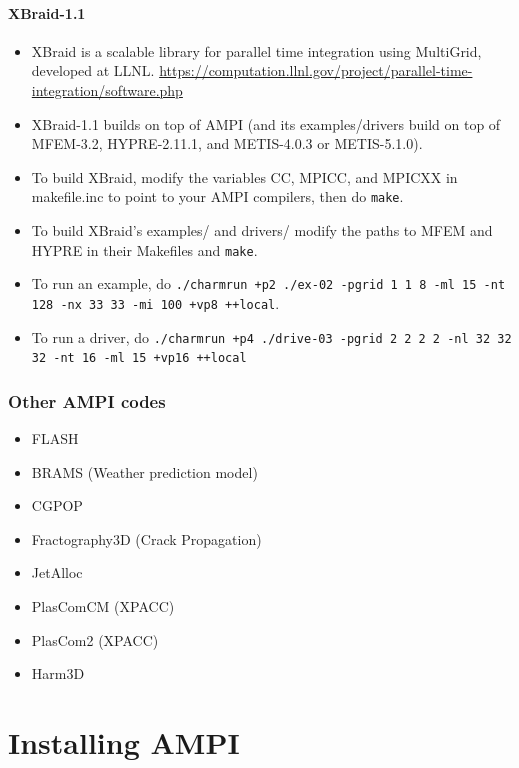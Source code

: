 \documentclass[10pt]{article}
\begin{document}
\paragraph{XBraid-1.1}
    \begin{itemize}
    \item
      XBraid is a scalable library for parallel time integration using
      MultiGrid, developed at LLNL. \url{https://computation.llnl.gov/project/parallel-time-integration/software.php}
    \item
      XBraid-1.1 builds on top of AMPI (and its examples/drivers build
      on top of MFEM-3.2, HYPRE-2.11.1, and METIS-4.0.3 or
      METIS-5.1.0).
    \item
      To build XBraid, modify the variables CC, MPICC, and MPICXX in
      makefile.inc to point to your AMPI compilers, then do \texttt{make}.
    \item
      To build XBraid's examples/ and drivers/ modify the paths to MFEM
      and HYPRE in their Makefiles and \texttt{make}.
    \item
      To run an example, do \texttt{./charmrun +p2 ./ex-02 -pgrid 1 1 8 -ml 15
      -nt 128 -nx 33 33 -mi 100 +vp8 ++local}.
    \item
      To run a driver, do \texttt{./charmrun +p4 ./drive-03 -pgrid 2 2 2 2 -nl
      32 32 32 -nt 16 -ml 15 +vp16 ++local}
    \end{itemize}


\subsubsection{Other AMPI codes}
  \begin{itemize}
  \item FLASH
  \item BRAMS (Weather prediction model)
  \item CGPOP
  \item Fractography3D (Crack Propagation)
  \item JetAlloc
  \item PlasComCM (XPACC)
  \item PlasCom2 (XPACC)
  \item Harm3D
  \end{itemize}


\appendix

\section{Installing AMPI}
\end{document}

